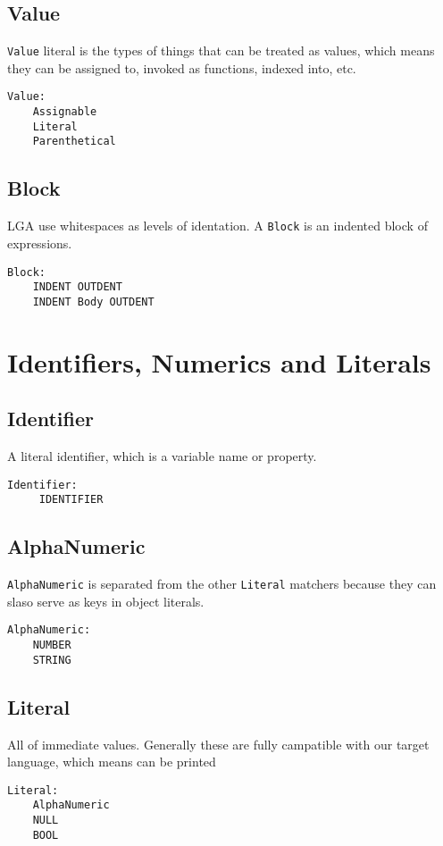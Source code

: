 \documentclass[10pt]{report}
\begin{document}
\subsection{Value}
\texttt{Value} literal is the types of things that can be treated as values, which means they can be assigned to, invoked as functions, indexed into, etc.

\begin{verbatim}
Value:
    Assignable
    Literal
    Parenthetical
\end{verbatim}

\subsection{Block}
\label{sec:block}

LGA use whitespaces as levels of identation. A \texttt{Block} is an indented block of expressions.
\begin{verbatim}
Block:
    INDENT OUTDENT
    INDENT Body OUTDENT
\end{verbatim}

\section{Identifiers,  Numerics and Literals}

\subsection{Identifier}
A literal identifier, which is a variable name or property.
\begin{verbatim}
Identifier:
     IDENTIFIER
\end{verbatim}

\subsection{AlphaNumeric}
\texttt{AlphaNumeric} is separated from the other \texttt{Literal} matchers because they can slaso serve as keys in object literals.
\begin{verbatim}
AlphaNumeric:
    NUMBER
    STRING
\end{verbatim}

\subsection{Literal}

All of immediate values. Generally these are fully campatible with our target language, which means can be printed
\begin{verbatim}
Literal:
    AlphaNumeric
    NULL
    BOOL
\end{verbatim}
\end{document}
